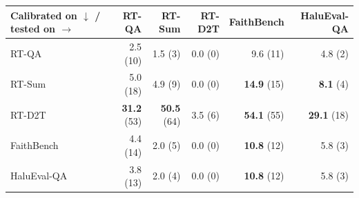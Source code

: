 \begin{tabular}{lrrrrr}
\toprule
Calibrated on $\downarrow$ / tested on $\rightarrow$ & RT-QA & RT-Sum & RT-D2T & FaithBench & HaluEval-QA \\
\midrule
RT-QA & 2.5 (10) & 1.5 (3) & 0.0 (0) & 9.6 (11) & 4.8 (2) \\
RT-Sum & 5.0 (18) & 4.9 (9) & 0.0 (0) & \textbf{14.9} (15) & \textbf{8.1} (4) \\
RT-D2T & \textbf{31.2} (53) & \textbf{50.5} (64) & 3.5 (6) & \textbf{54.1} (55) & \textbf{29.1} (18) \\
FaithBench & 4.4 (14) & 2.0 (5) & 0.0 (0) & \textbf{10.8} (12) & 5.8 (3) \\
HaluEval-QA & 3.8 (13) & 2.0 (4) & 0.0 (0) & \textbf{10.8} (12) & 5.8 (3) \\
\bottomrule
\end{tabular}
